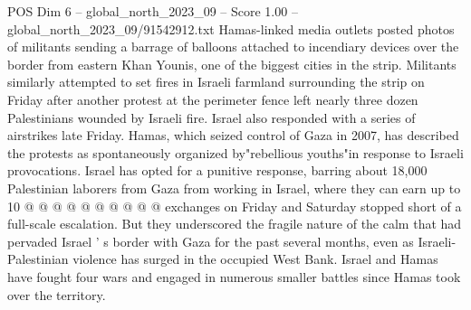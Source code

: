 \begin{textsample}{POS Dim 6 – global\_north\_2023\_09 – Score 1.00 – global\_north\_2023\_09/91542912.txt}
Hamas-linked media outlets posted photos of militants sending a barrage of balloons attached to incendiary devices over the border from eastern Khan Younis, one of the biggest cities in the strip.
Militants similarly attempted to set fires in Israeli farmland surrounding the strip on Friday after another protest at the perimeter fence left nearly three dozen Palestinians wounded by Israeli fire.
Israel also responded with a series of airstrikes late Friday.
Hamas, which seized control of Gaza in 2007, has described the protests as spontaneously organized by"rebellious youths"in response to Israeli provocations.
Israel has opted for a punitive response, barring about 18,000 Palestinian laborers from Gaza from working in Israel, where they can earn up to 10 @ @ @ @ @ @ @ @ @ @ exchanges on Friday and Saturday stopped short of a full-scale escalation.
But they underscored the fragile nature of the calm that had pervaded Israel ' s border with Gaza for the past several months, even as Israeli-Palestinian violence has surged in the occupied West Bank.
Israel and Hamas have fought four wars and engaged in numerous smaller battles since Hamas took over the territory.

\end{textsample}
